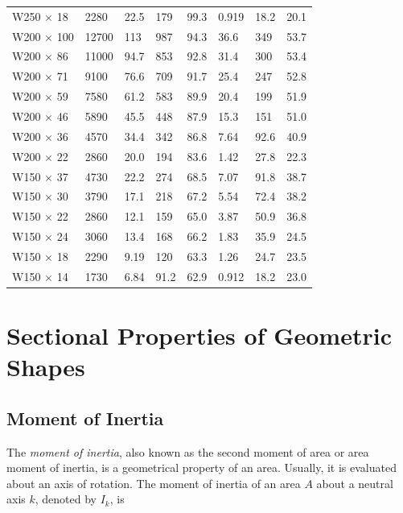 \documentclass[
10pt,
a4paper,
openany,
svgnames,
]{book}
\begin{document}
\begin{table}[H]
\begin{tabular}{ L{2.2cm} R{1cm} C{2cm} C{2cm} C{1cm} C{2cm} C{2cm} C{1cm}}
    W250 $\times$ 18  & 2280  & 22.5 & 179  & 99.3 & 0.919 & 18.2 & 20.1 \\
    W200 $\times$ 100 & 12700 & 113  & 987  & 94.3 & 36.6  & 349  & 53.7 \\
    W200 $\times$ 86  & 11000 & 94.7 & 853  & 92.8 & 31.4  & 300  & 53.4 \\
    W200 $\times$ 71  & 9100  & 76.6 & 709  & 91.7 & 25.4  & 247  & 52.8 \\
    W200 $\times$ 59  & 7580  & 61.2 & 583  & 89.9 & 20.4  & 199  & 51.9 \\
    W200 $\times$ 46  & 5890  & 45.5 & 448  & 87.9 & 15.3  & 151  & 51.0 \\
    W200 $\times$ 36  & 4570  & 34.4 & 342  & 86.8 & 7.64  & 92.6 & 40.9 \\
    W200 $\times$ 22  & 2860  & 20.0 & 194  & 83.6 & 1.42  & 27.8 & 22.3 \\
    W150 $\times$ 37  & 4730  & 22.2 & 274  & 68.5 & 7.07  & 91.8 & 38.7 \\
    W150 $\times$ 30  & 3790  & 17.1 & 218  & 67.2 & 5.54  & 72.4 & 38.2 \\
    W150 $\times$ 22  & 2860  & 12.1 & 159  & 65.0 & 3.87  & 50.9 & 36.8 \\
    W150 $\times$ 24  & 3060  & 13.4 & 168  & 66.2 & 1.83  & 35.9 & 24.5 \\
    W150 $\times$ 18  & 2290  & 9.19 & 120  & 63.3 & 1.26  & 24.7 & 23.5 \\
    W150 $\times$ 14  & 1730  & 6.84 & 91.2 & 62.9 & 0.912 & 18.2 & 23.0 \\
    \bottomrule
  \end{tabular}
\end{table}

\chapter{Sectional Properties of Geometric Shapes}

\section{Moment of Inertia}

The \emph{moment of inertia}, also known as the second moment of area or area moment of inertia, is a geometrical property of an area. Usually, it is evaluated about an axis of rotation. The moment of inertia of an area $A$ about a neutral axis $k$, denoted by $I_k$, is
\end{document}
